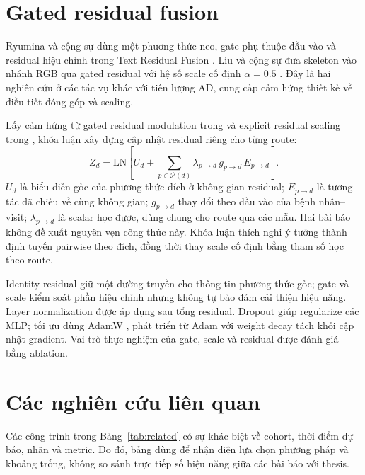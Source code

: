 \section{Gated residual fusion}
Ryumina và cộng sự dùng một phương thức neo, gate phụ thuộc đầu vào và residual hiệu chỉnh trong Text Residual Fusion \cite{ryumina2026residual}. Liu và cộng sự đưa skeleton vào nhánh RGB qua gated residual với hệ số scale cố định $\alpha=0.5$ \cite{liu2026motion}. Đây là hai nghiên cứu ở các tác vụ khác với tiên lượng AD, cung cấp cảm hứng thiết kế về điều tiết đóng góp và scaling.

Lấy cảm hứng từ gated residual modulation trong \cite{ryumina2026residual} và explicit residual scaling trong \cite{liu2026motion}, khóa luận xây dựng cập nhật residual riêng cho từng route:
\begin{equation}
 Z_d=\mathrm{LN}\left[U_d+\sum_{p\in\mathcal{P}(d)}
 \lambda_{p\rightarrow d}\,g_{p\rightarrow d}\,E_{p\rightarrow d}\right].
\label{eq:background-route}
\end{equation}
$U_d$ là biểu diễn gốc của phương thức đích ở không gian residual; $E_{p\rightarrow d}$ là tương tác đã chiếu về cùng không gian; $g_{p\rightarrow d}$ thay đổi theo đầu vào của bệnh nhân--visit; $\lambda_{p\rightarrow d}$ là scalar học được, dùng chung cho route qua các mẫu. Hai bài báo không đề xuất nguyên vẹn công thức này. Khóa luận thích nghi ý tưởng thành định tuyến pairwise theo đích, đồng thời thay scale cố định bằng tham số học theo route.

Identity residual giữ một đường truyền cho thông tin phương thức gốc; gate và scale kiểm soát phần hiệu chỉnh nhưng không tự bảo đảm cải thiện hiệu năng. Layer normalization \cite{ba2016layernorm} được áp dụng sau tổng residual. Dropout \cite{srivastava2014dropout} giúp regularize các MLP; tối ưu dùng AdamW \cite{loshchilov2019adamw}, phát triển từ Adam \cite{kingma2015adam} với weight decay tách khỏi cập nhật gradient. Vai trò thực nghiệm của gate, scale và residual được đánh giá bằng ablation.

\section{Các nghiên cứu liên quan}
Các công trình trong Bảng~\ref{tab:related} có sự khác biệt về cohort, thời điểm dự báo, nhãn và metric. Do đó, bảng dùng để nhận diện lựa chọn phương pháp và khoảng trống, không so sánh trực tiếp số hiệu năng giữa các bài báo với thesis.

